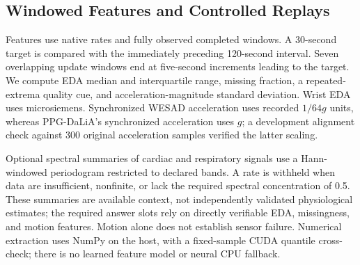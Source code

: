 \begin{table}[t]
\caption{Data and evaluation inventory. A case is one method at one checkpoint.
Raw scalar values count feature-processing inputs, including overlapping windows
and replay extraction; they are not independent observations.}
\label{tab:data}
\centering\small

\end{table}

\subsection{Windowed Features and Controlled Replays}

Features use native rates and fully observed completed windows. A 30-second
target is compared with the immediately preceding 120-second interval. Seven
overlapping update windows end at five-second increments leading to the target.
We compute EDA median and interquartile range, missing fraction, a repeated-extrema
quality cue, and acceleration-magnitude standard deviation. Wrist EDA uses
microsiemens. Synchronized WESAD acceleration uses recorded $1/64g$ units,
whereas PPG-DaLiA's synchronized acceleration uses $g$; a development alignment
check against 300 original acceleration samples verified the latter scaling.

Optional spectral summaries of cardiac and respiratory signals use a Hann-windowed
periodogram restricted to declared bands. A rate is withheld when data are
insufficient, nonfinite, or lack the required spectral concentration of 0.5.
These summaries are available context, not independently validated physiological
estimates; the required answer slots rely on directly verifiable EDA, missingness,
and motion features. Motion alone does not establish sensor failure. Numerical
extraction uses NumPy on the host, with a fixed-sample CUDA quantile cross-check;
there is no learned feature model or neural CPU fallback.

